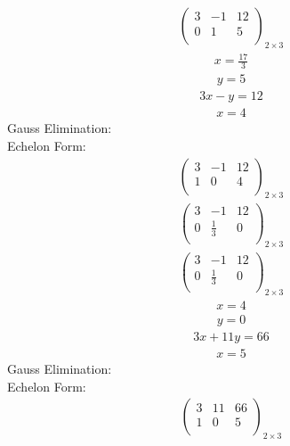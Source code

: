 \documentclass{article}
\begin{document}
\begin{align*}
\left(
\begin{array}{cc|c}
3 & -1 & 12\\
0 & 1 & 5\\
\end{array}
\right)_{2\times 3}
\end{align*}
\begin{align*}
x=\frac{17}{3}\end{align*}
\begin{align*}
y=5\end{align*}
\begin{align*}
3x - y=12\end{align*}
\begin{align*}
x=4\end{align*}
Gauss Elimination:\\
Echelon Form:\\
\begin{align*}
\left(
\begin{array}{cc|c}
3 & -1 & 12\\
1 & 0 & 4\\
\end{array}
\right)_{2\times 3}
\end{align*}
\begin{align*}
\left(
\begin{array}{cc|c}
3 & -1 & 12\\
0 & \frac{1}{3} & 0\\
\end{array}
\right)_{2\times 3}
\end{align*}
\begin{align*}
\left(
\begin{array}{cc|c}
3 & -1 & 12\\
0 & \frac{1}{3} & 0\\
\end{array}
\right)_{2\times 3}
\end{align*}
\begin{align*}
x=4\end{align*}
\begin{align*}
y=0\end{align*}
\begin{align*}
3x + 11y=66\end{align*}
\begin{align*}
x=5\end{align*}
Gauss Elimination:\\
Echelon Form:\\
\begin{align*}
\left(
\begin{array}{cc|c}
3 & 11 & 66\\
1 & 0 & 5\\
\end{array}
\right)_{2\times 3}
\end{align*}
\end{document}
